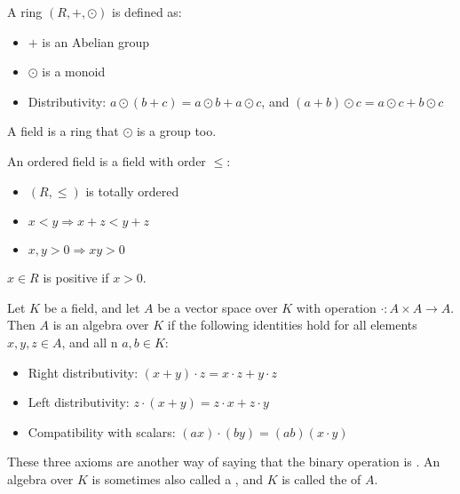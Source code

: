 \begin{definition}
    A ring $(R, +, \odot)$ is defined as:
    \begin{itemize}
        \item $+$ is an Abelian group
        \item $\odot$ is a monoid
        \item Distributivity: $a \odot (b + c) = a \odot b + a \odot c$, and $(a+b) \odot c = a \odot c + b \odot c$
    \end{itemize}
    
\end{definition}

\begin{definition}
    A field is a ring that $\odot$ is a group too.
\end{definition}

\begin{definition}
    An ordered field is a field with order $\leq$:
    \begin{itemize}
        \item $(R, \leq)$ is totally ordered
        \item $x < y \Rightarrow x + z < y + z$
        \item $x,y > 0 \Rightarrow xy > 0$
    \end{itemize}
    
    $x \in R$ is positive if $x > 0$.
\end{definition}

\begin{definition}
    Let $K$ be a field, and let $A$ be a vector space over $K$ with operation $\cdot : A \times A \rightarrow A$. Then $A$ is an algebra over $K$ if the following identities hold for all elements $x,y,z \in A$, and all n $a,b \in K$:
    \begin{itemize}
        \item Right distributivity: $(x+y) \cdot z = x \cdot z + y \cdot z$
        \item Left distributivity: $z \cdot (x+y) = z \cdot x + z \cdot y$
        \item Compatibility with scalars: $(ax) \cdot (by) = (ab) (x \cdot y)$
    \end{itemize}

    These three axioms are another way of saying that the binary operation is . An algebra over $K$ is sometimes also called a , and $K$ is called the  of $A$.
\end{definition}


